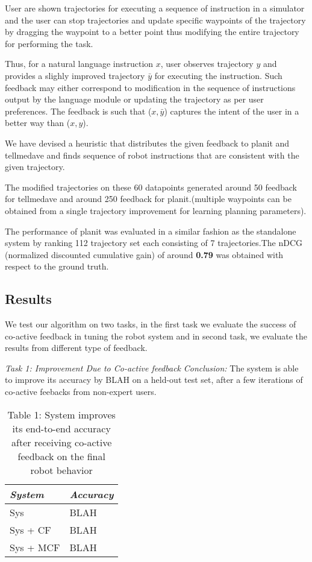 	User are shown trajectories for executing a sequence of instruction in a simulator and the user can stop trajectories and update specific waypoints of the trajectory by dragging the waypoint to a better point thus modifying the entire trajectory for performing the task.

	Thus, for a natural language instruction $x$, user observes trajectory $y$ and provides a slighly improved trajectory $\bar{y}$ for executing the instruction. Such feedback may either correspond to modification in the sequence of instructions output by the language module or updating the trajectory as per user preferences. The feedback is such that ($x,\bar{y}$) captures the intent of the user in a better way than ($x,y$).

	We have devised a heuristic that distributes the given feedback to planit and tellmedave and finds sequence of robot instructions that are consistent with the given trajectory.

	The modified trajectories on these 60 datapoints generated around 50 feedback for tellmedave and around 250 feedback for planit.(multiple waypoints can be obtained from a single trajectory improvement for learning planning parameters).

	The performance of planit was evaluated in a similar fashion as the standalone system by ranking 112 trajectory set each consisting of 7 trajectories.The nDCG (normalized discounted cumulative gain) of around \textbf{0.79} was obtained with respect to the ground truth.




\subsection{Results} %
We test our algorithm on two tasks, in the first task we evaluate the success of co-active feedback in tuning the robot system and in second task, we evaluate the results from different type of feedback.

\noindent\textit{Task 1: Improvement Due to Co-active feedback}
\textit{Conclusion:} The system is able to improve its accuracy by BLAH on a held-out test set, after a few iterations of co-active feebacks from non-expert users.

\begin{table}
\label{tbl:tsk1}
\caption{Table 1: System improves its end-to-end accuracy after receiving co-active feedback on the final robot behavior}
\centering
\begin{tabular}{|l|l|}
\hline
\textit{System} & \textit{Accuracy} \\
\hline
Sys & BLAH \\
Sys + CF & BLAH \\
Sys + MCF & BLAH \\
\hline
\end{tabular}
\end{table}

